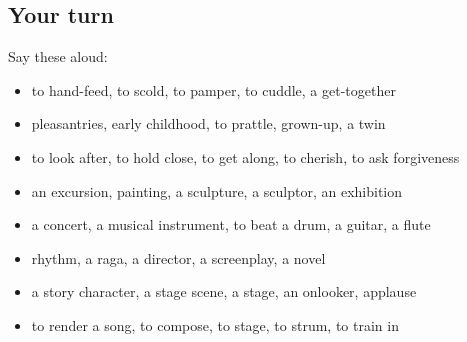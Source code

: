 \subsection*{Your turn}
Say these aloud:

\begin{itemize}
\raggedright
  \item to hand-feed, to scold, to pamper, to cuddle, a get-together
  \item pleasantries, early childhood, to prattle, grown-up, a twin
  \item to look after, to hold close, to get along, to cherish, to ask forgiveness
  \item an excursion, painting, a sculpture, a sculptor, an exhibition
  \item a concert, a musical instrument, to beat a drum, a guitar, a flute
  \item rhythm, a raga, a director, a screenplay, a novel
  \item a story character, a stage scene, a stage, an onlooker, applause
  \item to render a song, to compose, to stage, to strum, to train in
\end{itemize}


